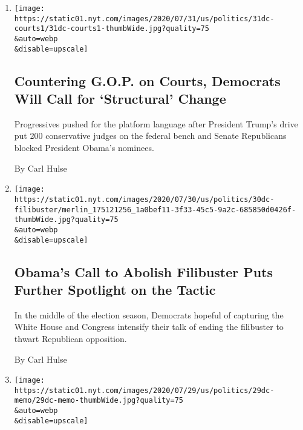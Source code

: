 \begin{enumerate}
\def\labelenumi{\arabic{enumi}.}
\item
  \href{/2020/07/31/us/democrats-judiciary-reform.html}{}

  \texttt{[image: https://static01.nyt.com/images/2020/07/31/us/politics/31dc-courts1/31dc-courts1-thumbWide.jpg?quality=75\\\&auto=webp\\\&disable=upscale]}

  \hypertarget{countering-gop-on-courts-democrats-will-call-for-structural-change}{%
  \subsection{Countering G.O.P. on Courts, Democrats Will Call for
  `Structural'
  Change}\label{countering-gop-on-courts-democrats-will-call-for-structural-change}}

  Progressives pushed for the platform language after President Trump's
  drive put 200 conservative judges on the federal bench and Senate
  Republicans blocked President Obama's nominees.

  By Carl Hulse
\item
  \href{/2020/07/30/us/obama-filibuster-senate-democrats.html}{}

  \texttt{[image: https://static01.nyt.com/images/2020/07/30/us/politics/30dc-filibuster/merlin\_175121256\_1a0bef11-3f33-45c5-9a2c-685850d0426f-thumbWide.jpg?quality=75\\\&auto=webp\\\&disable=upscale]}

  \hypertarget{obamas-call-to-abolish-filibuster-puts-further-spotlight-on-the-tactic}{%
  \subsection{Obama's Call to Abolish Filibuster Puts Further Spotlight
  on the
  Tactic}\label{obamas-call-to-abolish-filibuster-puts-further-spotlight-on-the-tactic}}

  In the middle of the election season, Democrats hopeful of capturing
  the White House and Congress intensify their talk of ending the
  filibuster to thwart Republican opposition.

  By Carl Hulse
\item
  \href{/2020/07/29/us/politics/republicans-congress-virus-aid.html}{}

  \texttt{[image: https://static01.nyt.com/images/2020/07/29/us/politics/29dc-memo/29dc-memo-thumbWide.jpg?quality=75\\\&auto=webp\\\&disable=upscale]}

  \hypertarget{congressional-memo}{%
}
\end{enumerate}

